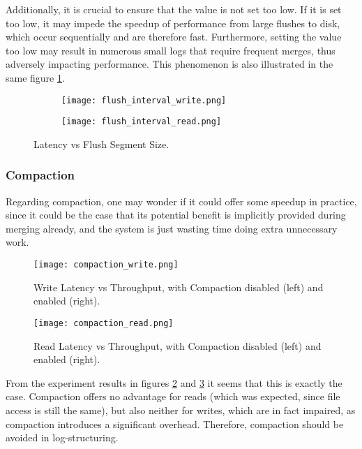 Additionally, it is crucial to ensure that the value is not set too low. If it is set too low, it may impede the speedup of performance from large flushes to disk, which occur sequentially and are therefore fast. Furthermore, setting the value too low may result in numerous small logs that require frequent merges, thus adversely impacting performance. This phenomenon is also illustrated in the same figure \ref{fig:flush_interval_write_read}.

\begin{figure}[h]
    \begin{subfigure}{.5\textwidth}
        \centering
        \texttt{[image: flush\_interval\_write.png]}
    \end{subfigure}
    \begin{subfigure}{.5\textwidth}
        \centering
        \texttt{[image: flush\_interval\_read.png]}
    \end{subfigure}
    \caption{Latency vs Flush Segment Size.}
    \label{fig:flush_interval_write_read}
\end{figure}

\subsubsection{Compaction}

Regarding compaction, one may wonder if it could offer some speedup in practice, since it could be the case that its potential benefit is implicitly provided during merging already, and the system is just wasting time doing extra unnecessary work.

\begin{figure}[h]
    \centering
    \texttt{[image: compaction\_write.png]}
    \caption{Write Latency vs Throughput, with Compaction disabled (left) and enabled (right).}
    \label{fig:compaction-write}
\end{figure}

\begin{figure}[h]
    \centering
    \texttt{[image: compaction\_read.png]}
    \caption{Read Latency vs Throughput, with Compaction disabled (left) and enabled (right).}
    \label{fig:compaction_read}
\end{figure}

From the experiment results in figures \ref{fig:compaction-write} and \ref{fig:compaction_read} it seems that this is exactly the case. Compaction offers no advantage for reads (which was expected, since file access is still the same), but also neither for writes, which are in fact impaired, as compaction introduces a significant overhead. Therefore, compaction should be avoided in log-structuring.

